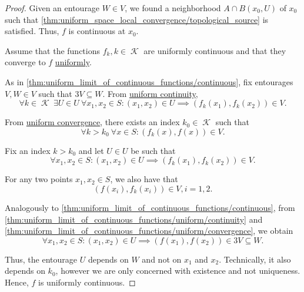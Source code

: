 \begin{proof}
  Given an entourage \( W \in V \), we found a neighborhood \( A \cap B(x_0, U) \) of \( x_0 \) such that \cref{thm:uniform_space_local_convergence/topological_source} is satisfied. Thus, \( f \) is continuous at \( x_0 \).

   Assume that the functions \( f_k, k \in \mscrK \) are uniformly continuous and that they converge to \( f \) \hyperref[def:function_net_convergence/locally_uniform]{uniformly}.

  As in \cref{thm:uniform_limit_of_continuous_functions/continuous}, fix entourages \( V, W \in V \) such that \( 3V \subseteq W \). From \hyperref[def:uniform_continuity]{uniform continuity},
  \begin{equation*}
    \forall k \in \mscrK \ \exists U \in U \ \forall x_1, x_2 \in S : (x_1, x_2) \in U \implies (f_k(x_1), f_k(x_2)) \in V.
  \end{equation*}

  From \hyperref[def:function_net_convergence]{uniform convergence}, there exists an index \( k_0 \in \mscrK \) such that
  \begin{equation*}
    \forall k > k_0 \ \forall x \in S : (f_k(x), f(x)) \in V.
  \end{equation*}

  Fix an index \( k > k_0 \) and let \( U \in U \) be such that
  \begin{equation}\label{thm:uniform_limit_of_continuous_functions/uniform/continuity}
    \forall x_1, x_2 \in S : (x_1, x_2) \in U \implies (f_k(x_1), f_k(x_2)) \in V.
  \end{equation}

  For any two points \( x_1, x_2 \in S \), we also have that
  \begin{equation}\label{thm:uniform_limit_of_continuous_functions/uniform/convergence}
    (f(x_i), f_k(x_i)) \in V, i = 1, 2.
  \end{equation}

  Analogously to \cref{thm:uniform_limit_of_continuous_functions/continuous}, from \eqref{thm:uniform_limit_of_continuous_functions/uniform/continuity} and \eqref{thm:uniform_limit_of_continuous_functions/uniform/convergence}, we obtain
  \begin{equation*}
    \forall x_1, x_2 \in S : (x_1, x_2) \in U \implies (f(x_1), f(x_2)) \in 3V \subseteq W.
  \end{equation*}

  Thus, the entourage \( U \) depends on \( W \) and not on \( x_1 \) and \( x_2 \). Technically, it also depends on \( k_0 \), however we are only concerned with existence and not uniqueness. Hence, \( f \) is uniformly continuous.
\end{proof}

